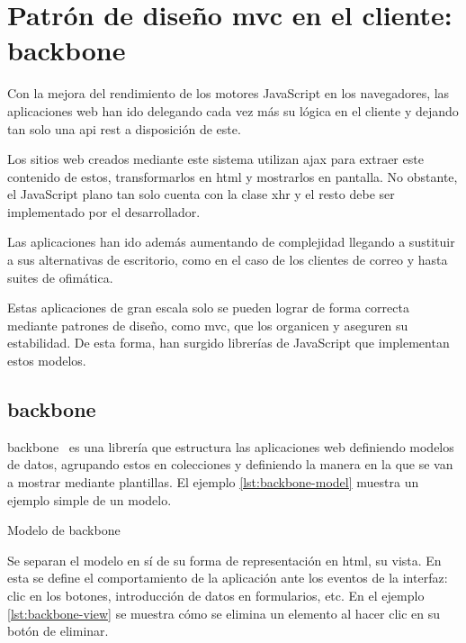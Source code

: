 \documentclass[main]{subfiles}
\begin{document}
\section[MVC en cliente: Backbone.js]{Patrón de diseño \gls{mvc} en el cliente: \gls{backbone}}
\label{sec:tech-backbone}

Con la mejora del rendimiento de los motores JavaScript en los navegadores, las aplicaciones web han ido delegando cada vez más su lógica en el cliente y dejando tan solo una \gls{api} \gls{rest} a disposición de este.

Los sitios web creados mediante este sistema utilizan \gls{ajax} para extraer este contenido de estos, transformarlos en \gls{html} y mostrarlos en pantalla. No obstante, el JavaScript plano tan solo cuenta con la clase \gls{xhr} y el resto debe ser implementado por el desarrollador.

Las aplicaciones han ido además aumentando de complejidad llegando a sustituir a sus alternativas de escritorio, como en el caso de los clientes de correo y hasta suites de ofimática.

Estas aplicaciones de gran escala solo se pueden lograr de forma correcta mediante patrones de diseño, como \gls{mvc}, que los organicen y aseguren su estabilidad. De esta forma, han surgido librerías de JavaScript que implementan estos modelos.

\subsection[Backbone.js]{\Gls{backbone}}

\Gls{backbone}~\autocite{backbone} es una librería que estructura las aplicaciones web definiendo modelos de datos, agrupando estos en colecciones y definiendo la manera en la que se van a mostrar mediante plantillas. El ejemplo \cref{lst:backbone-model} muestra un ejemplo simple de un modelo.

\begin{listing}
  \caption[Modelo de Backbone.js]{Modelo de \gls{backbone}}
  \label{lst:backbone-model}
\end{listing}

Se separan el modelo en sí de su forma de representación en \gls{html}, su vista. En esta se define el comportamiento de la aplicación ante los eventos de la interfaz: clic en los botones, introducción de datos en formularios, etc. En el ejemplo \cref{lst:backbone-view} se muestra cómo se elimina un elemento al hacer clic en su botón de eliminar.
\end{document}
